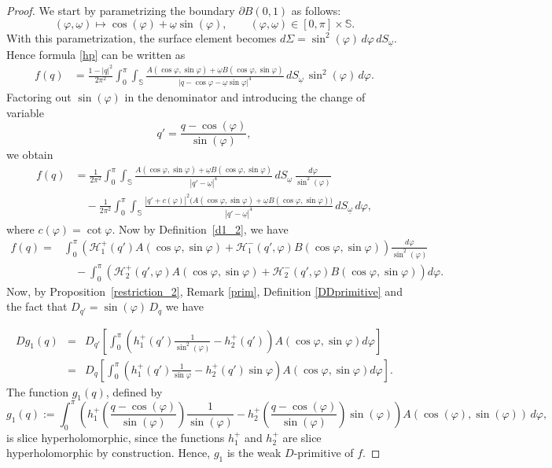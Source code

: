 \documentclass[reqno,11pt]{amsart}
\numberwithin{equation}{section}
\theoremstyle{definition}
\begin{document}
\begin{proof}
We start by parametrizing the boundary $\partial B(0,1)$ as follows:
$$
	(\varphi,\underline{\omega})\mapsto \cos(\varphi)+\underline{\omega}\sin(\varphi), \qquad (\varphi,\underline{\omega})\in [0,\pi]\times \mathbb S.
$$
	With this parametrization, the surface element becomes $d\Sigma=\sin^2(\varphi)\, d\varphi\, dS_{\underline{\omega}}$. Hence formula \eqref{hp} can be written as
	\begin{align*}
		f(q) &=\frac{1-|q|^2}{2 \pi^2}\int_0^{\pi} \int_{\mathbb S}
		\frac{ A(\cos\varphi,\sin\varphi)+\underline{\omega} B(\cos\varphi,\sin\varphi)}
		{\bigl|q-\cos\varphi-\underline{\omega} \sin\varphi\bigr|^4}
		\, dS_{\underline{\omega}}\, \sin^2(\varphi)\, d\varphi.
	\end{align*}
	Factoring out $\sin(\varphi)$ in the denominator and introducing the change of variable
	\[
	q'=\frac{q-\cos(\varphi)}{\sin(\varphi)},
	\]
	we obtain
	\begin{align}
	\label{intrem}
		f(q)
		&=\frac{1}{2 \pi^2}\int_0^{\pi} \int_{\mathbb S}
		\frac{ A(\cos\varphi,\sin\varphi)+\underline{\omega} B(\cos\varphi,\sin\varphi)}
		{|q'-\underline{\omega}|^4}
		\, dS_{\underline{\omega}}\, \frac{d\varphi}{\sin^2(\varphi)} \\
		\nonumber
		&\quad -\frac{1}{2 \pi^2 }\int_0^{\pi} \int_{\mathbb S}
		\frac{|q' + c(\varphi)|^2\bigl( A(\cos\varphi,\sin\varphi)+\underline{\omega} B(\cos\varphi,\sin\varphi)\bigr)}
		{|q'-\underline{\omega}|^4}
		\, dS_{\underline{\omega}}\, d\varphi,
	\end{align}
	where $c(\varphi)=\cot \varphi$. Now by Definition~\ref{d1_2}, we have
	\begin{align*}
		f(q)= &\int_0^{\pi}  \left( \mathcal H^+_1 (q')  A(\cos\varphi,\sin\varphi) + \mathcal H^-_1 (q',\varphi) B(\cos\varphi,\sin\varphi)  \right) \frac{d\varphi}{\sin^2(\varphi)}\\
		&\quad -\int_0^{\pi}  \left( \mathcal H^+_2 (q',\varphi)  A(\cos\varphi,\sin\varphi) + \mathcal H^-_2 (q',\varphi) B(\cos\varphi,\sin\varphi)  \right) d\varphi.
	\end{align*}
Now, by Proposition~\ref{restriction_2}, Remark \ref{prim}, Definition \ref{DDprimitive} and the fact that $D_{q'}=\sin(\varphi)\, D_q$ we have	

\begin{eqnarray*}
Dg_1(q)&=&D_{q'}\left[\int_0^{\pi}   \left( h^+_1 (q')   \frac{1}{\sin^2(\varphi)} -  h^+_2 (q')   \right) A(\cos\varphi,\sin\varphi) d\varphi \right]\\
&=&D_{q} \left[\int_0^{\pi} \left(h_1^{+}(q') \frac{1}{ \sin \varphi}- h^+_2 (q')   \sin \varphi\right)A(\cos\varphi,\sin\varphi)d\varphi \right].
\end{eqnarray*}
The function $g_1(q)$, defined by
$$
g_1(q):=\int_0^\pi \left( h_1^+\!\left(\frac{q-\cos(\varphi)}{\sin(\varphi)} \right)\frac{1}{\sin(\varphi)}- h_2^+\!\left(\frac{q-\cos(\varphi)}{\sin(\varphi)}\right) \sin(\varphi) \right) A(\cos(\varphi),\sin(\varphi))\, d\varphi,
$$
is slice hyperholomorphic, since the functions $h_1^{+}$ and $h_2^{+}$ are slice hyperholomorphic by construction. Hence, $g_1$ is the weak $D$-primitive of $f$.
\end{proof}
\end{document}
